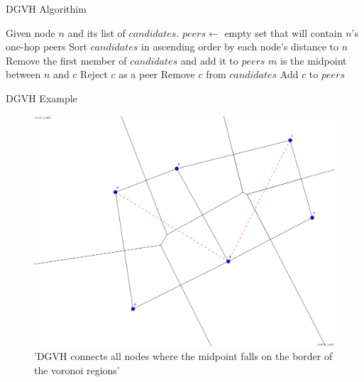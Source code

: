 \documentclass[8pt]{beamer}
\begin{document}
	
	\begin{frame}{DGVH Algorithim}

			\begin{algorithmic}[1]  %
				\STATE Given node $n$ and its list of $candidates$.
				\STATE $peers \leftarrow$ empty set that will contain $n$'s one-hop peers
				\STATE Sort $candidates$ in ascending order by each node's distance to $n$
				\STATE Remove the first member of $candidates$ and add it to $peers$
				\STATE $m$ is the midpoint between $n$ and $c$
				\STATE Reject $c$ as a peer
				\ELSE
				\STATE Remove $c$ from $candidates$
				\STATE Add $c$ to $peers$
				\ENDIF
				\ENDFOR
			\end{algorithmic}

	\end{frame}
	
	
	
\begin{frame}{DGVH Example}
	\begin{figure}
	\centering
	\includegraphics[width=0.5\linewidth]{DGVH}
	\caption{'DGVH connects all nodes where the midpoint falls on the border of the voronoi regions'}
	\label{delaunay}
\end{figure}
	\end{frame}
	
	
	
	
\end{document}
